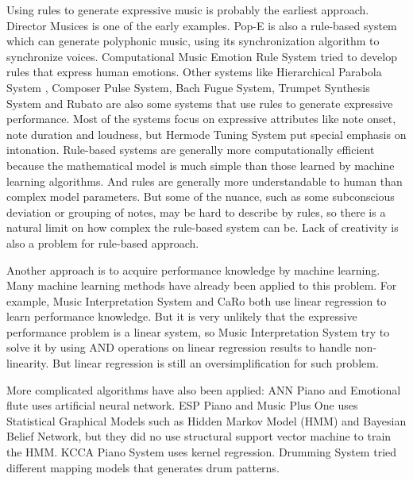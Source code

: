 Using rules to generate expressive music is probably the earliest approach. Director Musices \cite{17} is one of the early examples.   Pop-E \cite{28} is also a rule-based system which can generate polyphonic music, using its synchronization algorithm to synchronize voices. Computational Music Emotion Rule System \cite{31} tried to develop rules that express human emotions.  Other systems like Hierarchical Parabola System \cite{17}\cite{18}\cite{19}\cite{20}, Composer Pulse System\cite{21,22}, Bach Fugue System\cite{23}, Trumpet Synthesis System \cite{24, 25} and Rubato \cite{26, 27} are also some systems that use rules to generate expressive performance. Most of the systems focus on expressive attributes like note onset, note duration and loudness, but Hermode Tuning System \cite{29} put special emphasis on intonation. Rule-based systems are generally more computationally efficient because the mathematical model is much simple than those learned by machine learning algorithms. And rules are generally more understandable to human than complex model parameters. But some of the nuance, such as some subconscious deviation or grouping of notes, may be hard to describe by rules, so there is a natural limit on how complex the rule-based system can be. Lack of creativity is also a problem for rule-based approach.

Another approach is to acquire performance knowledge by machine learning. Many machine learning methods have already been applied to this problem. For example, Music Interpretation System \cite{32,33,34} and CaRo \cite{35,36,37} both use linear regression to learn performance knowledge. But it is very unlikely that the expressive performance problem is a linear system, so Music Interpretation System try to solve it by using AND operations on linear regression results to handle non-linearity. But linear regression is still an oversimplification for such problem.

More complicated algorithms have also been applied: ANN Piano \cite{38} and Emotional flute \cite{39} uses artificial neural network. ESP Piano \cite{55} and Music Plus One \cite{52,53,54} uses Statistical Graphical Models such as Hidden Markov Model (HMM) and Bayesian Belief Network, but they did no use structural support vector machine to train the HMM.%
KCCA Piano System \cite{57} uses kernel regression. Drumming System \cite{82} tried different mapping models that generates drum patterns.

